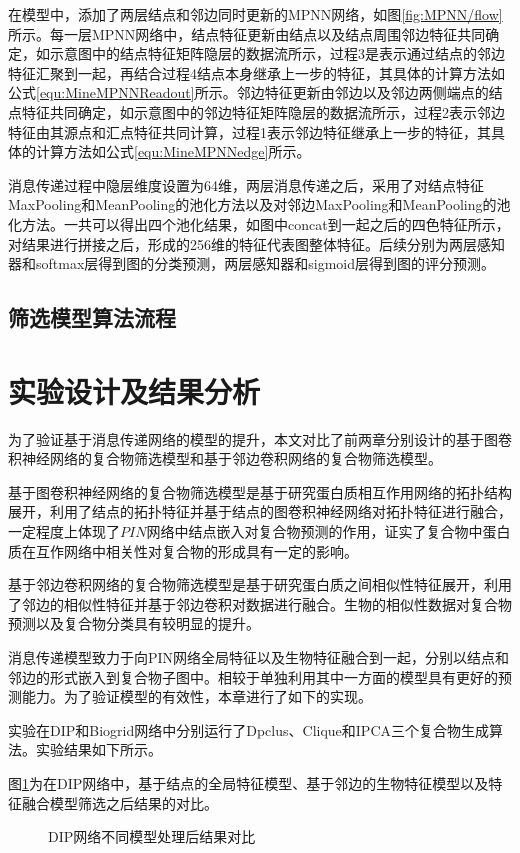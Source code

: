 在模型中，添加了两层结点和邻边同时更新的MPNN网络，如图\ref{fig:MPNN/flow}所示。每一层MPNN网络中，结点特征更新由结点以及结点周围邻边特征共同确定，如示意图中的结点特征矩阵隐层的数据流所示，过程3是表示通过结点的邻边特征汇聚到一起，再结合过程4结点本身继承上一步的特征，其具体的计算方法如公式\ref{equ:MineMPNNReadout}所示。邻边特征更新由邻边以及邻边两侧端点的结点特征共同确定，如示意图中的邻边特征矩阵隐层的数据流所示，过程2表示邻边特征由其源点和汇点特征共同计算，过程1表示邻边特征继承上一步的特征，其具体的计算方法如公式\ref{equ:MineMPNNedge}所示。

消息传递过程中隐层维度设置为64维，两层消息传递之后，采用了对结点特征MaxPooling和MeanPooling的池化方法以及对邻边MaxPooling和MeanPooling的池化方法。一共可以得出四个池化结果，如图中concat到一起之后的四色特征所示，对结果进行拼接之后，形成的256维的特征代表图整体特征。后续分别为两层感知器和softmax层得到图的分类预测，两层感知器和sigmoid层得到图的评分预测。

\subsection{筛选模型算法流程}

\section{实验设计及结果分析}
\label{section:MPNN:experience}
为了验证基于消息传递网络的模型的提升，本文对比了前两章分别设计的基于图卷积神经网络的复合物筛选模型和基于邻边卷积网络的复合物筛选模型。

基于图卷积神经网络的复合物筛选模型是基于研究蛋白质相互作用网络的拓扑结构展开，利用了结点的拓扑特征并基于结点的图卷积神经网络对拓扑特征进行融合，一定程度上体现了$PIN$网络中结点嵌入对复合物预测的作用，证实了复合物中蛋白质在互作网络中相关性对复合物的形成具有一定的影响。

基于邻边卷积网络的复合物筛选模型是基于研究蛋白质之间相似性特征展开，利用了邻边的相似性特征并基于邻边卷积对数据进行融合。生物的相似性数据对复合物预测以及复合物分类具有较明显的提升。

消息传递模型致力于向PIN网络全局特征以及生物特征融合到一起，分别以结点和邻边的形式嵌入到复合物子图中。相较于单独利用其中一方面的模型具有更好的预测能力。为了验证模型的有效性，本章进行了如下的实现。

实验在DIP和Biogrid网络中分别运行了Dpclus、Clique和IPCA三个复合物生成算法。实验结果如下所示。

图\ref{fig:result/DIP/fusion}为在DIP网络中，基于结点的全局特征模型、基于邻边的生物特征模型以及特征融合模型筛选之后结果的对比。
\begin{figure}[htbp]
    \centering
    \vskip0.2cm
    \caption{DIP网络不同模型处理后结果对比}
    \label{fig:result/DIP/fusion}
\end{figure}

